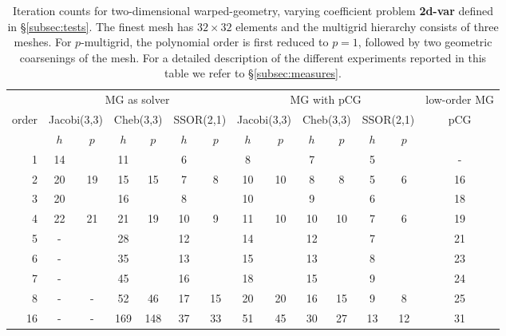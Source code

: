 \documentclass[times]{nlaauth}
\begin{document}
\begin{table}
  \caption{\label{tab:2d-fan} Iteration counts for two-dimensional
    warped-geometry, varying coefficient problem {\bf 2d-var} defined
    in \S\ref{subsec:tests}.  The finest
    mesh has $32\times 32$ elements and the multigrid hierarchy
    consists of three meshes.  For $p$-multigrid, the
    polynomial order is first reduced to $p=1$, followed by two
    geometric coarsenings of the mesh.
    For a
    detailed description of the different experiments reported in this
    table we refer to \S\ref{subsec:measures}.}  \centering
  \begin{tabular}{|r|c c|c c|c c||c c|c c|c c||c|} 
    \hline
    & \multicolumn{6}{c||}{MG as solver} & \multicolumn{6}{c||}{MG
      with pCG} & \!\!low-order MG\!\! \\
    \cline{2-13}
    \!\!\! order \!\!\!\! &  \multicolumn{2}{c|}{\!\!\scriptsize  Jacobi(3,3)\!\!} &  \multicolumn{2}{c|}{\!\!\scriptsize Cheb(3,3)\!\!} & \multicolumn{2}{c||}{\!\!\scriptsize  SSOR(2,1)\!\!} & \multicolumn{2}{c|}{\!\!\scriptsize Jacobi(3,3)\!\!} &  \multicolumn{2}{c|}{\!\!\scriptsize Cheb(3,3)\!\!} & \multicolumn{2}{c||}{\!\!\scriptsize SSOR(2,1)\!\!} & pCG\\
\hline
 & $h$ & $p$ & $h$ & $p$& $h$ & $p$& $h$ & $p$& $h$ & $p$& $h$ & $p$& ~ \\
 \cline{2-13}
1 & 14 & & 11 & & 6 & & 8 & & 7 & & 5 & & -   \\
2 & 20 & 19 & 15 & 15 & 7 & 8 & 10 & 10 & 8 & 8 & 5 & 6 & 16   \\
3 & 20 & & 16 & & 8 & & 10 & & 9 & & 6 & & 18  \\
4 & 22 & 21 & 21 & 19 & 10 & 9 & 11 & 10 & 10 & 10 & 7 & 6 & 19 \\
5 & -  & & 28 & & 12 & & 14 & & 12 & & 7 & & 21   \\
6 & -  & & 35 & & 13 & & 15 & & 13 & & 8 & & 23  \\
7 & -  & & 45 & & 16 & & 18 & & 15 & & 9 & & 24  \\
8 & -  & - & 52 & 46 & 17 & 15 & 20 & 20 & 16 & 15 & 9 & 8 & 25  \\
16 & - & - & 169 & 148 & 37 & 33 & 51 & 45 & 30 & 27 & 13 & 12 & 31 \\
\hline
  \end{tabular}
\end{table}
\end{document}
